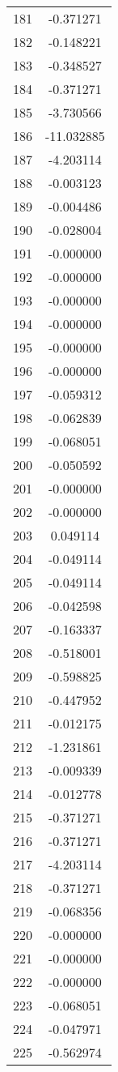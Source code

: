 \documentclass[12pt]{article}
\begin{document}
\begin{longtable}{@{}cc@{}}
181 & -0.371271 \\
182 & -0.148221 \\
183 & -0.348527 \\
184 & -0.371271 \\
185 & -3.730566 \\
186 & -11.032885 \\
187 & -4.203114 \\
188 & -0.003123 \\
189 & -0.004486 \\
190 & -0.028004 \\
191 & -0.000000 \\
192 & -0.000000 \\
193 & -0.000000 \\
194 & -0.000000 \\
195 & -0.000000 \\
196 & -0.000000 \\
197 & -0.059312 \\
198 & -0.062839 \\
199 & -0.068051 \\
200 & -0.050592 \\
201 & -0.000000 \\
202 & -0.000000 \\
203 & 0.049114 \\
204 & -0.049114 \\
205 & -0.049114 \\
206 & -0.042598 \\
207 & -0.163337 \\
208 & -0.518001 \\
209 & -0.598825 \\
210 & -0.447952 \\
211 & -0.012175 \\
212 & -1.231861 \\
213 & -0.009339 \\
214 & -0.012778 \\
215 & -0.371271 \\
216 & -0.371271 \\
217 & -4.203114 \\
218 & -0.371271 \\
219 & -0.068356 \\
220 & -0.000000 \\
221 & -0.000000 \\
222 & -0.000000 \\
223 & -0.068051 \\
224 & -0.047971 \\
225 & -0.562974 \\

\end{longtable}
\end{document}
